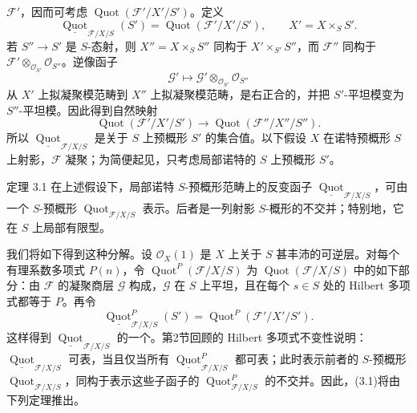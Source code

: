 $\mathcal F'$，因而可考虑 $\operatorname{Quot}(\mathcal F'/X'/S')$。定义
\[
\underline{\operatorname{Quot}}_{\mathcal F/X/S}(S')
=\operatorname{Quot}(\mathcal F'/X'/S'),\qquad X'=X\times_SS'.
\]
若 $S''\to S'$ 是 $S$-态射，则 $X''=X\times_SS''$ 同构于 $X'\times_{S'}S''$，而 $\mathcal F''$ 同构于 $\mathcal F'\otimes_{\mathcal O_{S'}}\mathcal O_{S''}$。逆像函子
\[
\mathcal G'\longmapsto\mathcal G'\otimes_{\mathcal O_{S'}}\mathcal O_{S''}
\]
从 $X'$ 上拟凝聚模范畴到 $X''$ 上拟凝聚模范畴，是右正合的，并把 $S'$-平坦模变为 $S''$-平坦模。因此得到自然映射
\[
\operatorname{Quot}(\mathcal F'/X'/S')\longrightarrow
\operatorname{Quot}(\mathcal F''/X''/S'').
\]
所以 $\underline{\operatorname{Quot}}_{\mathcal F/X/S}$ 是关于 $S$ 上预概形 $S'$ 的集合值。以下假设 $X$ 在诺特预概形 $S$ 上射影，$\mathcal F$ 凝聚；为简便起见，只考虑局部诺特的 $S$ 上预概形 $S'$。

\begin{statement}{定理 3.1}
在上述假设下，局部诺特 $S$-预概形范畴上的反变函子 $\underline{\operatorname{Quot}}_{\mathcal F/X/S}$，可由一个 $S$-预概形 $\operatorname{Quot}_{\mathcal F/X/S}$ 表示。后者是一列射影 $S$-概形的不交并；特别地，它在 $S$ 上局部有限型。
\end{statement}
我们将如下得到这种分解。设 $\mathcal O_X(1)$ 是 $X$ 上关于 $S$ 甚丰沛的可逆层。对每个有理系数多项式 $P(n)$，令 $\operatorname{Quot}^{P}(\mathcal F/X/S)$ 为 $\operatorname{Quot}(\mathcal F/X/S)$ 中的如下部分：由 $\mathcal F$ 的凝聚商层 $\mathcal G$ 构成，$\mathcal G$ 在 $S$ 上平坦，且在每个 $s\in S$ 处的 Hilbert 多项式都等于 $P$。再令
\[
\underline{\operatorname{Quot}}^{P}_{\mathcal F/X/S}(S')
=\operatorname{Quot}^{P}(\mathcal F'/X'/S').
\]
这样得到 $\underline{\operatorname{Quot}}_{\mathcal F/X/S}$ 的一个。第2节回顾的 Hilbert 多项式不变性说明：$\underline{\operatorname{Quot}}_{\mathcal F/X/S}$ 可表，当且仅当所有 $\underline{\operatorname{Quot}}^{P}_{\mathcal F/X/S}$ 都可表；此时表示前者的 $S$-预概形 $\operatorname{Quot}_{\mathcal F/X/S}$，同构于表示这些子函子的 $\operatorname{Quot}^{P}_{\mathcal F/X/S}$ 的不交并。因此，(3.1)将由下列定理推出。

